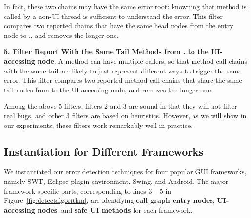 In fact, these two chains may have the same error root: knowning that
method  is called by a non-UI thread is sufficient to understand
the error.
This filter compares two reported chains that have the same
head nodes from the entry node to .,
and removes the longer one.

\textbf{5. Filter Report With the Same Tail Methods from .
to the UI-accessing node}. A method
can have multiple callers, so that method call chains with the same tail are likely
to just represent different ways to trigger the same error. This filter compares 
two reported method call chains that share the same 
tail nodes from  to the UI-accessing node, and
removes the longer one.


\vspace{1mm}

Among the above 5 filters, filters 2 and 3 are sound
in that they will not filter real bugs, and other 3 filters
are based on heuristics. However, as we will show in
our experiments, these filters work remarkably well in practice.


\subsection{Instantiation for Different Frameworks}
\label{sec:platforms}

We instantiated our error detection techniques for four popular GUI frameworks,
namely SWT, Eclipse plugin environment, Swing, and Android.
The major framework-specific parts, corresponding to
lines 3 -- 5 in Figure~\ref{fig:detectalgorithm}, are identifying
\textbf{call graph entry nodes}, \textbf{UI-accessing nodes},
and \textbf{safe UI methods} for each framework.





